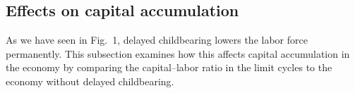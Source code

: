 \documentclass[nogrid]{MBE}%
\begin{document}
{%
%

\subsection{Effects on capital accumulation\label{subsec:Compare}}

As we have seen in Fig.~1, delayed childbearing lowers the labor force permanently. This
subsection examines how this affects capital accumulation in the economy by comparing the
capital--labor ratio in the limit cycles to the economy without delayed childbearing.

}
\end{document}
